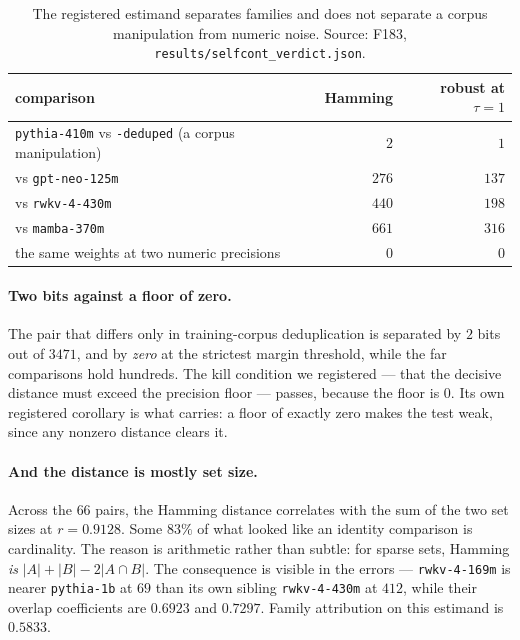 \documentclass[11pt]{article}
\begin{document}
\begin{table}[t]\centering\small
\begin{tabular}{lrr}
\toprule
comparison & Hamming & robust at $\tau = 1$ \\
\midrule
\texttt{pythia-410m} vs \texttt{-deduped} (a corpus manipulation) & $2$ & $1$ \\
vs \texttt{gpt-neo-125m} & $276$ & $137$ \\
vs \texttt{rwkv-4-430m} & $440$ & $198$ \\
vs \texttt{mamba-370m} & $661$ & $316$ \\
\midrule
the same weights at two numeric precisions & $0$ & $0$ \\
\bottomrule
\end{tabular}
\caption{The registered estimand separates families and does not separate a corpus manipulation from
numeric noise. Source: F183, \texttt{results/selfcont\_verdict.json}.}
\label{tab:e1}
\end{table}

\paragraph{Two bits against a floor of zero.} The pair that differs only in training-corpus
deduplication is separated by $2$ bits out of $3471$, and by \emph{zero} at the strictest margin
threshold, while the far comparisons hold hundreds. The kill condition we registered --- that the
decisive distance must exceed the precision floor --- passes, because the floor is $0$. Its own
registered corollary is what carries: a floor of exactly zero makes the test weak, since any nonzero
distance clears it.

\paragraph{And the distance is mostly set size.} Across the $66$ pairs, the Hamming distance
correlates with the sum of the two set sizes at $r = 0.9128$. Some $83\%$ of what looked like an
identity comparison is cardinality. The reason is arithmetic rather than subtle: for sparse sets,
Hamming \emph{is} $|A| + |B| - 2|A \cap B|$. The consequence is visible in the errors ---
\texttt{rwkv-4-169m} is nearer \texttt{pythia-1b} at $69$ than its own sibling
\texttt{rwkv-4-430m} at $412$, while their overlap coefficients are $0.6923$ and $0.7297$. Family
attribution on this estimand is $0.5833$.
\end{document}
